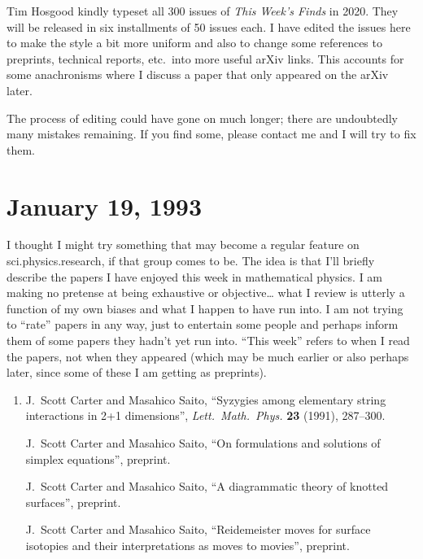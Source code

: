 \documentclass{article}
\begin{document}
Tim Hosgood kindly typeset all 300 issues of \emph{This Week's Finds} in 2020. They
will be released in six installments of 50 issues each.  I have edited the issues here
to make the style a bit more uniform and also to change some references to preprints,
technical reports, etc.\ into more useful arXiv links.  This accounts for some anachronisms
where I discuss a paper that only appeared on the arXiv later.   

The process of editing could have gone on much longer; there are undoubtedly many 
mistakes remaining.  If you find some, please contact me and I will try to fix them.

\tableofcontents

\hypertarget{week1}{%
\section{January 19, 1993}\label{week1}}

I thought I might try something that may become a regular feature on
sci.physics.research, if that group comes to be. The idea is
that I'll briefly describe the papers I have enjoyed this week in
mathematical physics. I am making no pretense at being exhaustive or
objective\ldots{} what I review is utterly a function of my own biases
and what I happen to have run into. I am not trying to ``rate'' papers
in any way, just to entertain some people and perhaps inform them of
some papers they hadn't yet run into. ``This week'' refers to when I
read the papers, not when they appeared (which may be much earlier or
also perhaps later, since some of these I am getting as preprints).

\begin{enumerate}
\def\labelenumi{\arabic{enumi})}
\item
  J.\ Scott Carter and Masahico Saito, ``Syzygies among elementary string 
  interactions in 2+1 dimensions'', \emph{Lett.\ Math.\ Phys.}
  \textbf{23} (1991), 287--300.

  J.\ Scott Carter and Masahico Saito, ``On formulations and solutions of simplex equations'', preprint.

  J.\ Scott Carter and Masahico Saito, ``A diagrammatic theory of knotted surfaces'', preprint.

 J.\ Scott Carter and Masahico Saito, ``Reidemeister moves for surface isotopies and their interpretations as moves to movies'', preprint.
\end{enumerate}
\end{document}
